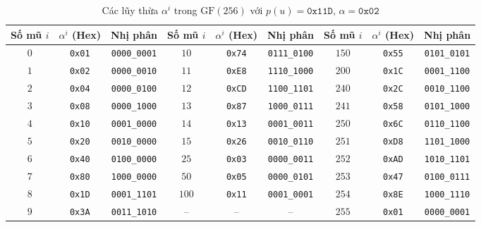 \documentclass[12pt,a4paper]{report}
\begin{document}
\begin{table}[!htb]
    \centering
    \caption{Các lũy thừa $\alpha^i$ trong $\text{GF}(256)$ với $p(u) = \texttt{0x11D}$, $\alpha = \texttt{0x02}$}
    \label{tab:gf-alpha-powers}
    \small
    \setlength{\tabcolsep}{4pt}
    \begin{tabular}{@{}ccc|ccc|ccc@{}}
        \toprule
        \textbf{Số mũ $i$} & \textbf{$\alpha^i$ (Hex)} & \textbf{Nhị phân} & \textbf{Số mũ $i$} & \textbf{$\alpha^i$ (Hex)} & \textbf{Nhị phân} & \textbf{Số mũ $i$} & \textbf{$\alpha^i$ (Hex)} & \textbf{Nhị phân} \\
        \midrule
        $0$  & \texttt{0x01} & \texttt{0000\_0001} & $10$ & \texttt{0x74} & \texttt{0111\_0100} & $150$ & \texttt{0x55} & \texttt{0101\_0101} \\
        $1$  & \texttt{0x02} & \texttt{0000\_0010} & $11$ & \texttt{0xE8} & \texttt{1110\_1000} & $200$ & \texttt{0x1C} & \texttt{0001\_1100} \\
        $2$  & \texttt{0x04} & \texttt{0000\_0100} & $12$ & \texttt{0xCD} & \texttt{1100\_1101} & $240$ & \texttt{0x2C} & \texttt{0010\_1100} \\
        $3$  & \texttt{0x08} & \texttt{0000\_1000} & $13$ & \texttt{0x87} & \texttt{1000\_0111} & $241$ & \texttt{0x58} & \texttt{0101\_1000} \\
        $4$  & \texttt{0x10} & \texttt{0001\_0000} & $14$ & \texttt{0x13} & \texttt{0001\_0011} & $250$ & \texttt{0x6C} & \texttt{0110\_1100} \\
        $5$  & \texttt{0x20} & \texttt{0010\_0000} & $15$ & \texttt{0x26} & \texttt{0010\_0110} & $251$ & \texttt{0xD8} & \texttt{1101\_1000} \\
        $6$  & \texttt{0x40} & \texttt{0100\_0000} & $25$ & \texttt{0x03} & \texttt{0000\_0011} & $252$ & \texttt{0xAD} & \texttt{1010\_1101} \\
        $7$  & \texttt{0x80} & \texttt{1000\_0000} & $50$ & \texttt{0x05} & \texttt{0000\_0101} & $253$ & \texttt{0x47} & \texttt{0100\_0111} \\
        $8$  & \texttt{0x1D} & \texttt{0001\_1101} & $100$ & \texttt{0x11} & \texttt{0001\_0001} & $254$ & \texttt{0x8E} & \texttt{1000\_1110} \\
        $9$  & \texttt{0x3A} & \texttt{0011\_1010} & -- & -- & -- & $255$ & \texttt{0x01} & \texttt{0000\_0001} \\
        \bottomrule
    \end{tabular}
\end{table}
\end{document}
